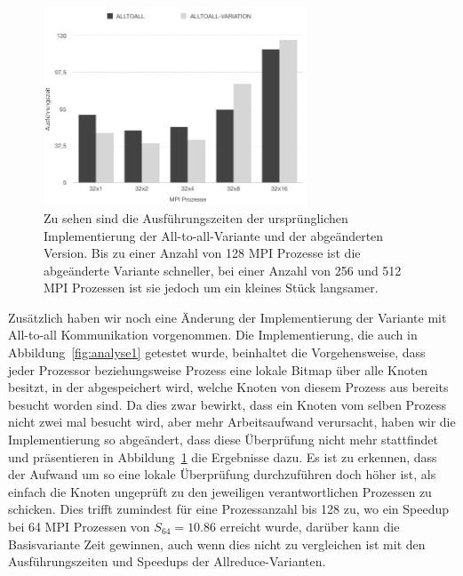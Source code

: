\documentclass[11pt,a4paper]{article}
\begin{document}
\begin{figure}[h]
 	\centering
	\includegraphics[width=0.7\textwidth]{alltoall_variation}
 	\caption{Zu sehen sind die Ausführungszeiten der ursprünglichen Implementierung der All-to-all-Variante und der abgeänderten Version. Bis zu einer Anzahl von 128 MPI Prozesse ist die abgeänderte Variante schneller, bei einer Anzahl von 256 und 512 MPI Prozessen ist sie jedoch um ein kleines Stück langsamer.}
	\label{fig:alltoall_change}
\end{figure}
Zusätzlich haben wir noch eine Änderung der Implementierung der Variante mit All-to-all Kommunikation vorgenommen. Die Implementierung, die auch in Abbildung~\ref{fig:analyse1} getestet wurde, beinhaltet die Vorgehensweise, dass jeder Prozessor beziehungsweise Prozess eine lokale Bitmap über alle Knoten besitzt, in der abgespeichert wird, welche Knoten von diesem Prozess aus bereits besucht worden sind. Da dies zwar bewirkt, dass ein Knoten vom selben Prozess nicht zwei mal besucht wird, aber mehr Arbeitsaufwand verursacht, haben wir die Implementierung so abgeändert, dass diese Überprüfung nicht mehr stattfindet und präsentieren in Abbildung~\ref{fig:alltoall_change} die Ergebnisse dazu. Es ist zu erkennen, dass der Aufwand um so eine lokale Überprüfung durchzuführen doch höher ist, als einfach die Knoten ungeprüft zu den jeweiligen verantwortlichen Prozessen zu schicken. Dies trifft zumindest für eine Prozessanzahl bis 128 zu, wo ein Speedup bei 64 MPI Prozessen von \(S_{64} = 10.86\) erreicht wurde, darüber kann die Basisvariante Zeit gewinnen, auch wenn dies nicht zu vergleichen ist mit den Ausführungszeiten und Speedups der Allreduce-Varianten.
\end{document}
